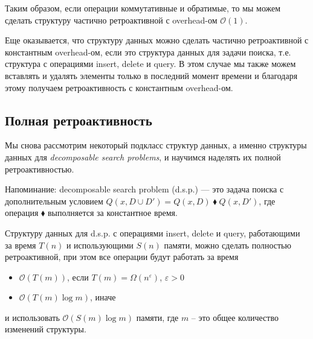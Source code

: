 Таким образом, если операции коммутативные и обратимые, то мы можем сделать структуру частично ретроактивной с overhead-ом $\mathcal{O}(1)$.

Еще оказывается, что структуру данных можно сделать частично ретроактивной с константным overhead-ом, если это структура данных для задачи поиска, 
т.е. структура с операциями insert, delete и query.
В этом случае мы также можем вставлять и удалять элементы только в последний момент времени и благодаря этому получаем ретроактивность с константным overhead-ом.


\subsection*{Полная ретроактивность}

Мы снова рассмотрим некоторый подкласс структур данных, а именно структуры данных для {\it decomposable search problems}, и научимся наделять их полной ретроактивностью. 

Напоминание: decomposable search problem (d.s.p.) --- это задача поиска с дополнительным условием $Q(x, D \cup D') = Q(x, D) \; \blacklozenge \; Q(x, D')$, 
где операция $\blacklozenge$ выполняется за константное время.

\begin{theorem} 

Структуру данных для d.s.p. с операциями insert, delete и query, работающими за время $T(n)$ и использующими $S(n)$ памяти, можно сделать полностью ретроактивной,
при этом все операции будут работать за время

\end{theorem}

\begin{itemize}

\item $\mathcal{O}(T(m))$, если $T(m) = \Omega(n^{\varepsilon})$, $\varepsilon > 0$
\item $\mathcal{O}(T(m) \log m)$, иначе

\end{itemize}

и использовать $\mathcal{O}(S(m) \log m)$ памяти, где $m$ -- это общее количество изменений структуры.

